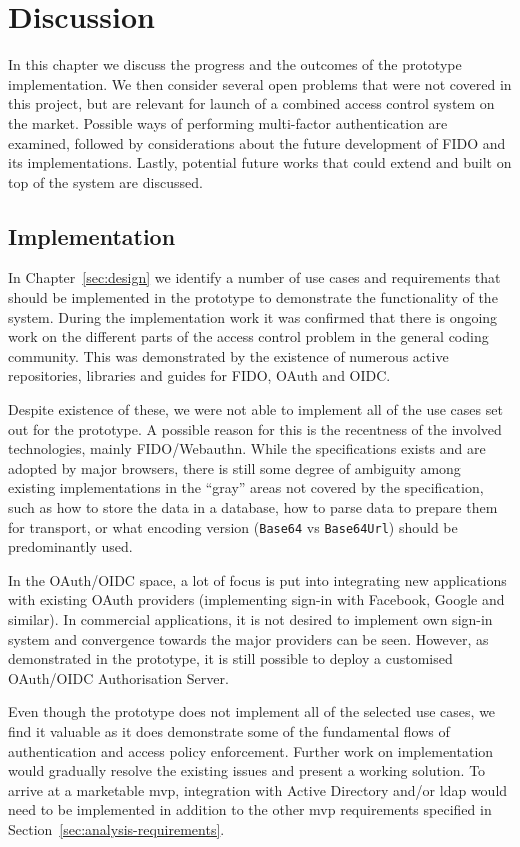 \section{Discussion}\label{sec:discussion}
In this chapter we discuss the progress and the outcomes of the prototype implementation. We then consider several open problems that were not covered in this project, but are relevant for launch of a combined access control system on the market. Possible ways of performing multi-factor authentication are examined, followed by considerations about the future development of FIDO and its implementations. Lastly, potential future works that could extend and built on top of the system are discussed.

\subsection*{Implementation}
In Chapter~\ref{sec:design} we identify a number of use cases and requirements that should be implemented in the prototype to demonstrate the functionality of the system. During the implementation work it was confirmed that there is ongoing work on the different parts of the access control problem in the general coding community. This was demonstrated by the existence of numerous active repositories, libraries and guides for FIDO, OAuth and OIDC.

Despite existence of these, we were not able to implement all of the use cases set out for the prototype. A possible reason for this is the recentness of the involved technologies, mainly FIDO/Webauthn. While the specifications exists and are adopted by major browsers, there is still some degree of ambiguity among existing implementations in the ``gray'' areas not covered by the specification, such as how to store the data in a database, how to parse data to prepare them for transport, or what encoding version (\texttt{Base64} vs \texttt{Base64Url}) should be predominantly used.

In the OAuth/OIDC space, a lot of focus is put into integrating new applications with existing OAuth providers (implementing sign-in with Facebook, Google and similar). In commercial applications, it is not desired to implement own sign-in system and convergence towards the major providers can be seen. However, as demonstrated in the prototype, it is still possible to deploy a customised OAuth/OIDC Authorisation Server.

Even though the prototype does not implement all of the selected use cases, we find it valuable as it does demonstrate some of the fundamental flows of authentication and access policy enforcement. Further work on implementation would gradually resolve the existing issues and present a working solution. To arrive at a marketable \acrshort{mvp}, integration with Active Directory and/or \acrshort{ldap} would need to be implemented in addition to the other \acrshort{mvp} requirements specified in Section~\ref{sec:analysis-requirements}.




